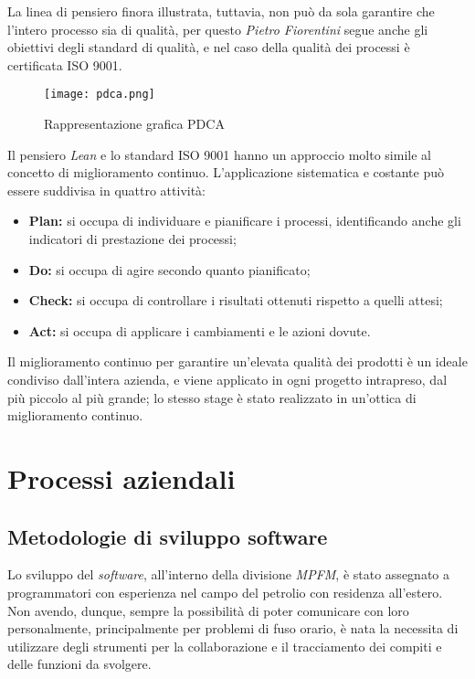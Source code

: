 La linea di pensiero finora illustrata, tuttavia, non può da sola garantire che l'intero processo sia di qualità, per questo \textit{Pietro Fiorentini} segue anche gli obiettivi degli standard di qualità, e nel caso della qualità dei processi è certificata ISO 9001.
\begin{figure}[H]
  \centering
  \texttt{[image: pdca.png]}
  \caption{Rappresentazione grafica PDCA}
\end{figure}

Il pensiero \textit{Lean} e lo standard ISO 9001 hanno un approccio molto simile al concetto di miglioramento continuo. L'applicazione sistematica e costante può essere suddivisa in quattro attività:
\begin{itemize}
\item \textbf{Plan: } si occupa di individuare e pianificare i processi, identificando anche gli indicatori di prestazione dei processi;
\item \textbf{Do: } si occupa di agire secondo quanto pianificato;
\item \textbf{Check: } si occupa di controllare i risultati ottenuti rispetto a quelli attesi;
\item \textbf{Act: } si occupa di applicare i cambiamenti e le azioni dovute.
\end{itemize}

Il miglioramento continuo per garantire un'elevata qualità dei prodotti è un ideale condiviso dall'intera azienda, e viene applicato in ogni progetto intrapreso, dal più piccolo al più grande; lo stesso stage è stato realizzato in un'ottica di miglioramento continuo.

\section{Processi aziendali}
\subsection{Metodologie di sviluppo software}
Lo sviluppo del \textit{software}, all'interno della divisione \textit{MPFM}, è stato assegnato a programmatori con esperienza nel campo del petrolio con residenza all'estero. Non avendo, dunque, sempre la possibilità di poter comunicare con loro personalmente, principalmente per problemi di fuso orario, è nata la necessita di utilizzare degli strumenti per la collaborazione e il tracciamento dei compiti e delle funzioni da svolgere. 

